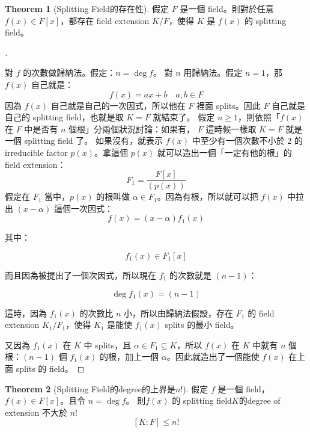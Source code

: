 \documentclass[12pt]{article}
\theoremstyle{definition}
\newtheorem{thm}{Theorem}
\newenvironment{proofs}[1][\proofname]{%
  \begin{proof}[#1]$ $\par\nobreak\ignorespaces
}{%
  \end{proof}
}
\begin{document}
\begin{thm}[Splitting Field的存在性]
	假定 $F$ 是一個 field。則對於任意 $f(x) \in F[x]$，都存在 field extension $K/F$，使得 $K$ 是 $f(x)$ 的 splitting field。
\end{thm}

\begin{proofs}
	對 $f$ 的次數做歸納法。假定：$	n = \deg f$。
	對 $n$ 用歸納法。假定 $n = 1$，那 $f(x)$ 自己就是：
	$$
		f(x) = ax + b \quad a, b \in F
	$$
	因為 $f(x)$ 自己就是自己的一次因式，所以他在 $F$ 裡面 splits。因此 $F$ 自己就是自己的 splitting field，也就是取 $K = F$ 就結束了。
	假定 $n \geq 1$，則依照「$f(x)$ 在 $F$ 中是否有 $n$ 個根」分兩個狀況討論：如果有， $F$ 這時候一樣取 $K = F$ 就是一個 splitting field 了。
	如果沒有，就表示 $f(x)$ 中至少有一個次數不小於 $2$ 的 irreducible factor  $p(x)$。拿這個 $p(x)$ 就可以造出一個「一定有他的根」的 field extension：
	$$
		F_1 = \frac {F[x]}{(p(x))}
	$$
	假定在 $F_1$ 當中，$p(x)$ 的根叫做 $\alpha \in F_1$。因為有根，所以就可以把 $f(x)$ 中拉出 $(x - \alpha)$ 這個一次因式：
	$$
		f(x) = (x - \alpha)f_1(x)
	$$

	其中：

	$$
		f_1(x) \in F_1[x]
	$$

	而且因為被提出了一個次因式，所以現在 $f_1$ 的次數就是 $(n - 1)$：

	$$
		\deg f_1(x) = (n - 1)
	$$

	這時，因為 $f_1(x)$ 的次數比 $n$ 小，所以由歸納法假設，存在 $F_1$ 的 field extension  $K_1/F_1$，使得 $K_1$ 是能使 $f_1(x)$ splits 的最小 field。

	又因為 $f_1(x)$ 在 $K$ 中 splits，且 $\alpha \in F_1 \subseteq K$，所以 $f(x)$ 在 $K$ 中就有 $n$ 個根：$(n - 1)$ 個 $f_1(x)$ 的根，加上一個 $\alpha$。因此就造出了一個能使 $f(x)$ 在上面 splits 的 field。
\end{proofs}

\begin{thm}[Splitting Field的degree的上界是$n!$]
	假定 $f$ 是一個 field，$f(x) \in F[x]$。且令 $n=\deg f$。
	則$f(x)$ 的 splitting field$K$的degree of extension 不大於 $n!$
	$$
		[K:F] \leq n!
	$$
\end{thm}
\end{document}
